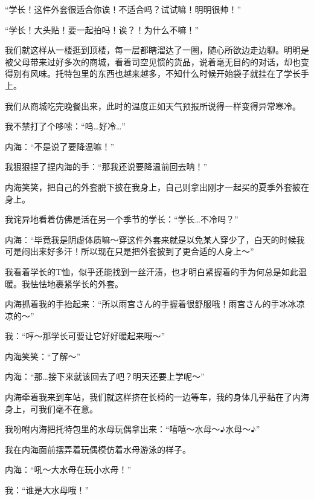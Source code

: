 “学长！这件外套很适合你诶！不适合吗？试试嘛！明明很帅！”

“学长！大头贴！要一起拍吗！诶？！为什么不嘛！”

我们就这样从一楼逛到顶楼，每一层都瞎溜达了一圈，随心所欲边走边聊。明明是被父母带来过好多次的商城，看着司空见惯的货品，说着毫无目的的对话，却也变得别有风味。托特包里的东西也越来越多，不知什么时候开始袋子就挂在了学长手上。

我们从商城吃完晚餐出来，此时的温度正如天气预报所说得一样变得异常寒冷。

我不禁打了个哆嗦：“呜…好冷…”

内海：“不是说了要降温嘛！”

我狠狠捏了捏内海的手：“那我还说要降温前回去呐！”

内海笑笑，把自己的外套脱下披在我身上，自己则拿出刚才一起买的夏季外套披在身上。

我诧异地看着仿佛是活在另一个季节的学长：“学长…不冷吗？”

内海：“毕竟我是阴虚体质嘛～穿这件外套来就是以免某人穿少了，白天的时候我可是闷出来好多汗！所以现在只是把外套披到了更合适的人身上～”

我看着学长的T恤，似乎还能找到一丝汗渍，也才明白紧握着的手为何总是如此温暖。我怯怯地裹紧学长的外套。

内海抓着我的手抬起来：“所以雨宫さん的手握着很舒服哦！雨宫さん的手冰冰凉凉的～”

我：“哼～那学长可要让它好好暖起来哦～”

内海笑笑：“了解～”



内海：“那…接下来就该回去了吧？明天还要上学呢～”
















\newday{\windy\cloud\harfmoonr\night}


内海牵着我来到车站，我们就这样挤在长椅的一边等车，我的身体几乎黏在了内海身上，可我们毫不在意。

我吩咐内海把托特包里的水母玩偶拿出来：“嘻嘻～水母～$\eighthnote$水母～$\eighthnote$”

我在内海面前摆弄着玩偶模仿着水母游泳的样子。

内海：“吼～大水母在玩小水母！”

我：“谁是大水母哦！”

